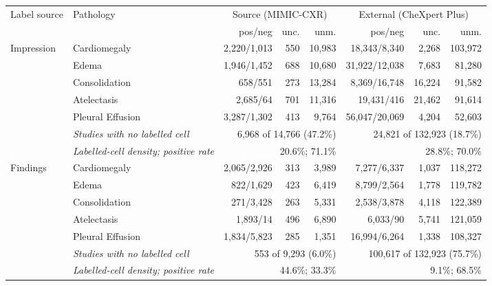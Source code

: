 \begin{tabular}{llrrrrrr}
\toprule
Label source & Pathology & \multicolumn{3}{c}{Source (MIMIC-CXR)} & \multicolumn{3}{c}{External (CheXpert Plus)}\\
\cmidrule(lr){3-5}\cmidrule(lr){6-8}
 & & pos/neg & unc. & unm. & pos/neg & unc. & unm.\\
\midrule
Impression & Cardiomegaly & 2,220/1,013 & 550 & 10,983 & 18,343/8,340 & 2,268 & 103,972\\
 & Edema & 1,946/1,452 & 688 & 10,680 & 31,922/12,038 & 7,683 & 81,280\\
 & Consolidation & 658/551 & 273 & 13,284 & 8,369/16,748 & 16,224 & 91,582\\
 & Atelectasis & 2,685/64 & 701 & 11,316 & 19,431/416 & 21,462 & 91,614\\
 & Pleural Effusion & 3,287/1,302 & 413 & 9,764 & 56,047/20,069 & 4,204 & 52,603\\
 & \emph{Studies with no labelled cell} & \multicolumn{3}{r}{6,968 of 14,766 (47.2\%)} & \multicolumn{3}{r}{24,821 of 132,923 (18.7\%)}\\
 & \emph{Labelled-cell density; positive rate} & \multicolumn{3}{r}{20.6\%; 71.1\%} & \multicolumn{3}{r}{28.8\%; 70.0\%}\\
\midrule
Findings & Cardiomegaly & 2,065/2,926 & 313 & 3,989 & 7,277/6,337 & 1,037 & 118,272\\
 & Edema & 822/1,629 & 423 & 6,419 & 8,799/2,564 & 1,778 & 119,782\\
 & Consolidation & 271/3,428 & 263 & 5,331 & 2,538/3,878 & 4,118 & 122,389\\
 & Atelectasis & 1,893/14 & 496 & 6,890 & 6,033/90 & 5,741 & 121,059\\
 & Pleural Effusion & 1,834/5,823 & 285 & 1,351 & 16,994/6,264 & 1,338 & 108,327\\
 & \emph{Studies with no labelled cell} & \multicolumn{3}{r}{553 of 9,293 (6.0\%)} & \multicolumn{3}{r}{100,617 of 132,923 (75.7\%)}\\
 & \emph{Labelled-cell density; positive rate} & \multicolumn{3}{r}{44.6\%; 33.3\%} & \multicolumn{3}{r}{9.1\%; 68.5\%}\\
\bottomrule
\end{tabular}
